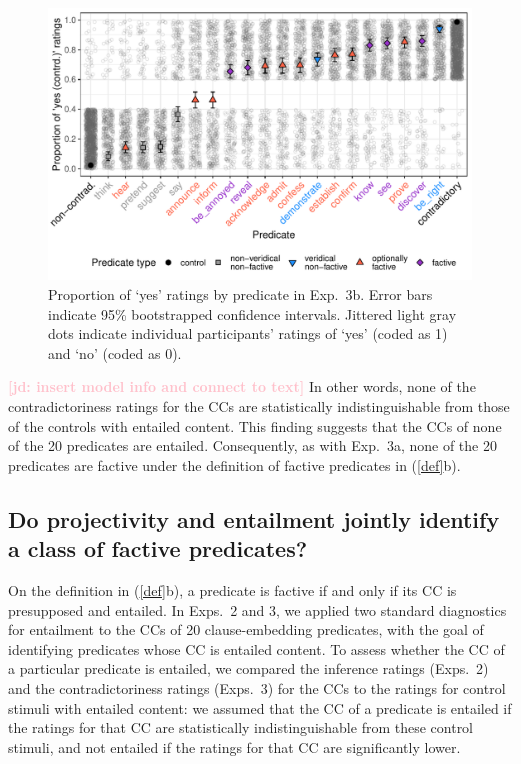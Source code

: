 \documentclass[11pt,fleqn]{article}
\newcommand{\jd}[1]{\textbf{\textcolor{Pink}{[jd: #1]}}}
\newcommand{\6}{\mbox{$[\hspace*{-.6mm}[$}}
\newcommand{\9}{\mbox{$]\hspace*{-.6mm}]$}}
\begin{document}
{\begin{figure}[h!]
\centering
\includegraphics[width=.7\paperwidth]{../../results/6-veridicality2-binary/graphs/proportion-by-predicate-variability-individual}
\caption{Proportion of `yes' ratings by predicate in Exp.~3b. Error bars indicate 95\% bootstrapped confidence intervals. Jittered light gray dots indicate individual participants' ratings of `yes' (coded as 1) and `no' (coded as 0). }
\label{fig:3bresults}
\end{figure}

\jd{insert model info and connect to text} In other words, none of the contradictoriness ratings for the CCs are statistically indistinguishable from those of the controls with entailed content. This finding suggests that the CCs of none of the 20 predicates are entailed. Consequently, as with Exp.~3a, none of the 20 predicates are factive under the definition of factive predicates in (\ref{def}b). 

\subsection{Do projectivity and entailment jointly identify a class of factive predicates?}\label{s33}

On the definition in (\ref{def}b), a predicate is factive if and only if its CC is presupposed and entailed. In Exps.~2 and 3, we applied two standard diagnostics for entailment to the CCs of 20 clause-embedding predicates, with the goal of identifying predicates whose CC is entailed content. To assess whether the CC of a particular predicate is entailed, we compared the inference ratings (Exps.~2) and the contradictoriness ratings (Exps.~3) for the CCs to the ratings for control stimuli with entailed content: we assumed that the CC of a predicate is entailed if the ratings for that CC are statistically indistinguishable from these control stimuli, and not entailed if the ratings for that CC are significantly lower. 

}
\end{document}
